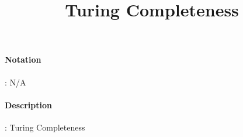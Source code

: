 \documentclass[10pt,a4paper,oneside]{scrartcl}
\author{}
\title{Turing Completeness}
\date{}
\begin{document}
\maketitle
\paragraph{Notation}: N/A
\paragraph{Description}: Turing Completeness

\printbibliography
\end{document}

